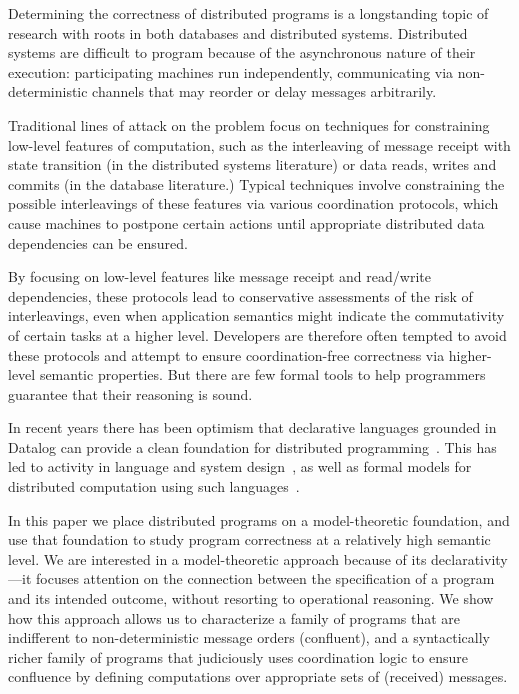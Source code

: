 \begin{itemize}
Determining the correctness of distributed programs is a longstanding topic of research with roots in both databases and distributed systems.  Distributed systems are difficult to program because of the asynchronous nature of their execution: participating machines run independently, communicating via non-deterministic channels that may reorder or delay messages arbitrarily.  

Traditional lines of attack on the problem focus on techniques for constraining low-level features of computation, such as the interleaving of message receipt with state transition (in the distributed systems literature) or data reads, writes and commits (in the database literature.)  Typical techniques involve constraining the possible interleavings of these features via various coordination protocols, which cause machines to postpone certain actions until appropriate distributed data dependencies can be ensured.

By focusing on low-level features like message receipt and read/write dependencies, these protocols lead to conservative assessments of the risk of interleavings, even when application semantics might indicate the commutativity of certain tasks at a higher level. Developers are therefore often tempted to avoid these protocols and attempt to ensure coordination-free correctness via higher-level semantic properties.  But there are few formal tools to help programmers guarantee that their reasoning is sound.

In recent years there has been optimism that declarative languages grounded in Datalog can provide a clean foundation for distributed programming~\cite{declarativeimperative}.  This has led to activity in language and system design~\cite{declarative distributed languages}, as well as formal models for distributed computation using such languages~\cite{transducers,}.  

In this paper we place distributed programs on a model-theoretic foundation, and use that foundation to study program correctness at a relatively high semantic level.  We are interested in a model-theoretic approach because of its declarativity---it focuses attention on the connection between the specification of a program and its intended outcome, without resorting to operational reasoning.  We show how this approach allows us to characterize a family of programs that are indifferent to non-deterministic message orders (confluent), and a syntactically richer family of programs that judiciously uses coordination logic to ensure confluence by defining computations over appropriate sets of (received) messages.


\end{itemize}
